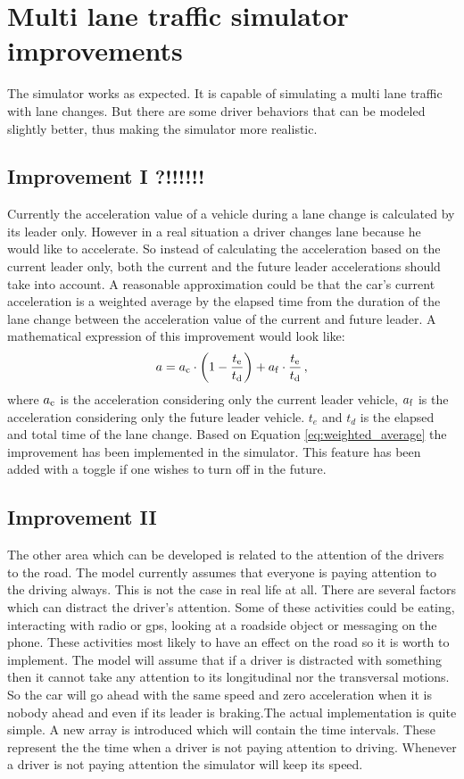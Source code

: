 		\section{Multi lane traffic simulator improvements}
		The simulator works as expected. It is capable of simulating a multi lane traffic with lane changes. But there are some driver behaviors that can be modeled slightly better, thus making the simulator  more realistic.
		\subsection*{Improvement I ?!!!!!!}
		Currently the acceleration value of a vehicle during a lane change is calculated by its leader only. However in a real situation a driver changes lane because he would like to accelerate. So instead of calculating the acceleration based on the current leader only, both the current and the future leader accelerations should take into account. A reasonable approximation could be that the car's current acceleration is a weighted average by the elapsed time from the duration of the lane change between the acceleration value of the current and  future leader. A mathematical expression of this improvement would look like:
		\begin{equation}
			a=a_{\rm c} \cdot \left(1-\frac{t_{\rm e}}{t_{\rm d}}\right) + a_{\rm f}\cdot \frac{t_{\rm e}}{t_{\rm d}}\,,
			\label{eq:weighted_average}
		\end{equation}
		where $a_{\rm c}$ is the acceleration considering only the current leader vehicle, $a_{\rm f}$  is the acceleration considering only the future leader vehicle. $t_e$ and $t_d$ is the elapsed and total time of the lane change. Based on Equation \ref{eq:weighted_average} the improvement has been implemented in the simulator. This feature has been added with a toggle if one wishes to turn off in the future.
		\subsection*{Improvement II}
		The other area which can be developed is related to the attention of the drivers to the road. The model currently assumes that everyone is paying attention to the driving always. This is not the case in real life at all. There are several factors which can distract the driver's attention. Some of these activities could be eating, interacting with radio or gps, looking at a roadside object or messaging on the phone. These activities most likely to have an effect on the road so it is worth to implement. The model will assume that if a driver is distracted with something then it cannot take any attention to its longitudinal nor the transversal motions. So the car will go ahead with the same speed and zero acceleration when it is nobody ahead and even if its leader is braking.The actual implementation is quite simple. A new array is introduced which will contain the time intervals. These represent the the time when a driver is not paying attention to driving. Whenever a driver is not paying attention the simulator will keep its speed.

